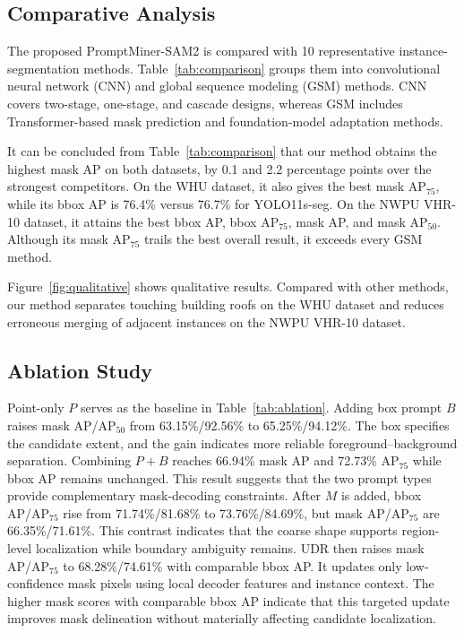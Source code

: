 \documentclass{article}
\begin{document}
\subsection{Comparative Analysis}
 The proposed PromptMiner-SAM2 is compared with 10 representative
instance-segmentation methods. Table~\ref{tab:comparison} groups them into convolutional neural network (CNN) and global sequence modeling (GSM) methods. CNN covers two-stage, one-stage, and cascade designs, whereas GSM includes Transformer-based mask prediction and foundation-model adaptation methods.

It can be concluded from Table~\ref{tab:comparison} that our method obtains
the highest mask AP on both datasets, by 0.1 and 2.2 percentage points over the strongest competitors. On the WHU dataset, it also gives the best mask AP$_{75}$, while its bbox AP is 76.4\% versus 76.7\% for YOLO11s-seg. On the NWPU VHR-10 dataset, it attains the best bbox AP, bbox AP$_{75}$, mask AP, and mask AP$_{50}$. Although its mask AP$_{75}$ trails the best overall result, it exceeds every GSM method.

Figure~\ref{fig:qualitative} shows qualitative results. Compared with other methods, our method separates touching building roofs on the WHU dataset and reduces erroneous merging of adjacent instances on the NWPU VHR-10 dataset.

\subsection{Ablation Study}
\vspace{-0.35em}
Point-only $P$ serves as the baseline in Table~\ref{tab:ablation}. Adding box prompt $B$ raises mask AP/AP$_{50}$ from 63.15\%/92.56\% to 65.25\%/94.12\%. 
The box specifies the candidate extent, and the gain indicates more reliable foreground--background separation.
Combining $P{+}B$ reaches 66.94\% mask AP and 72.73\% AP$_{75}$ while bbox AP remains unchanged.
This result suggests that the two prompt types provide complementary mask-decoding constraints.
After $M$ is added, bbox AP/AP$_{75}$ rise from 71.74\%/81.68\% to 73.76\%/84.69\%, but mask AP/AP$_{75}$ are 66.35\%/71.61\%. 
This contrast indicates that the coarse shape supports region-level localization while boundary ambiguity remains. 
UDR then raises mask AP/AP$_{75}$ to 68.28\%/74.61\% with comparable bbox AP. It updates only low-confidence mask pixels using local decoder features and instance context. The higher mask scores with comparable bbox AP indicate that this targeted update improves mask delineation without materially affecting candidate localization.
\end{document}
